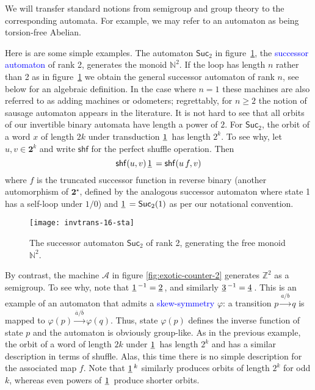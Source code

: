 \documentclass[12pt]{svmult}
\def\emph#1{\textcolor{blue}{#1}}
\def\2{\mathbf{2}}
\def\F#1{\underline{\smash{#1}}\,}       %
\def\SS{\Star{\2}}
\def\SUC#1{\mathsf{Suc}_{#1}}
\def\cA{\mathcal{A}}
\def\gshuf{\mathsf{shf}}
\def\N{\mathbb{N}}
\def\oa{\overline{a}}
\def\ob{\overline{b}}
\def\Z{\mathbb{Z}}
\def\trans#1#2#3{{#1}\stackrel{{#2}}{\longrightarrow}{#3}}
\providecommand{\Star}[1]{{#1}^{\star}}
\begin{document}
We will transfer standard notions from semigroup and group theory to the corresponding
automata. 
For example, we may refer to an automaton as being torsion-free Abelian. 

Here is are some simple examples. 
The automaton $\SUC{2}$ in figure~\ref{fig:successor-2}, the \emph{successor automaton} 
of rank 2, generates the monoid $\N^{2}$. 
If the loop has length $n$ rather than 2 as in figure~\ref{fig:successor-2} we obtain
the general successor automaton of rank $n$, see below for an algebraic definition. 
In the case where $n=1$ these machines are also referred to as adding machines or odometers;
regrettably, for $n \geq 2$ the notion of sausage automaton appears in the literature. 
It is not hard to see that all orbits of our invertible binary automata have length a power of $2$. 
For $\SUC{2}$, the orbit of a word $x$ of length $2k$ under transduction $\F{1}$ has length $2^{k}$. 
To see why, let $u, v \in \2^{k}$ and write $\gshuf$ for the perfect shuffle operation. 
Then 
%
$$
     \gshuf(u,v) \, \F{1} = \gshuf( u \, f, v )
$$
%
where $f$ is the truncated successor function in reverse binary
(another automorphism of $\SS$, defined by the analogous successor automaton 
where state 1 has a self-loop under $1/0$) and $\F{1} = \SUC{2}(1)$ as per our 
notational convention. 


\begin{figure}[t]
  \centering
  \texttt{[image: invtrans-16-sta]}
  \caption{The successor automaton $\SUC{2}$ of rank 2, generating the free monoid $\N^{2}$.}
  \label{fig:successor-2}
\end{figure}

By contrast, the machine $\cA$ in figure \ref{fig:exotic-counter-2} generates $\Z^2$ as 
a semigroup.  To see why, note that $\F{1}^{-1} = \F{2}$, and similarly 
$\F{3}^{-1} = \F{4}$. 
This is an example of an automaton that admits a \emph{skew-symmetry} $\varphi$: 
a transition $\trans{p}{a/b}{q}$ is mapped to $\trans{\varphi(p)}{\oa/\ob}{\varphi(q)}$. 
Thus,  state $\varphi(p)$ defines the inverse function of state $p$ and the automaton 
is obviously group-like. 
As in the previous example, the orbit of a word of 
length $2k$ under $\F{1}$ has length $2^{k}$ and has a similar description in terms of 
shuffle. Alas, this time there is no simple description for the associated map $f$. 
Note that $\F{1}^{k}$ similarly produces orbits of length $2^{k}$ for odd $k$, 
whereas even powers of $\F{1}$ produce shorter orbits. 
\end{document}

